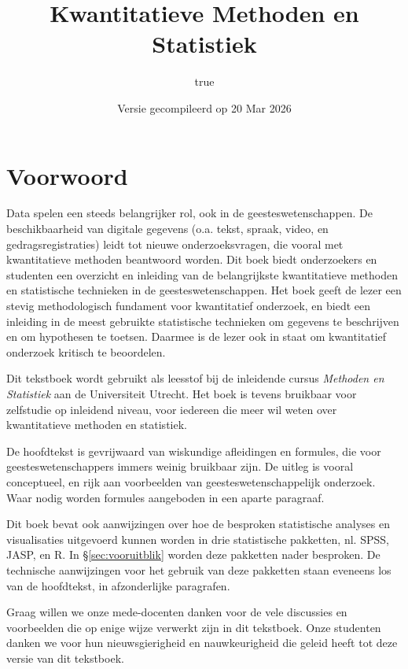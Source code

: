 \documentclass[
]{book}
\title{Kwantitatieve Methoden en Statistiek}
\author{true}
\date{Versie gecompileerd op 20 Mar 2026}
\begin{document}
\maketitle

{
\setcounter{tocdepth}{1}
\tableofcontents
}
\chapter*{Voorwoord}\label{voorwoord}

Data spelen een steeds belangrijker rol, ook in de geesteswetenschappen.
De beschikbaarheid van digitale gegevens (o.a. tekst, spraak, video, en gedragsregistraties) leidt tot nieuwe onderzoeksvragen, die vooral met kwantitatieve methoden beantwoord worden.
Dit boek biedt onderzoekers en studenten een overzicht en inleiding van de belangrijkste kwantitatieve methoden en statistische technieken in de geesteswetenschappen. Het boek geeft de lezer een stevig methodologisch fundament voor kwantitatief onderzoek, en biedt een inleiding in de meest gebruikte statistische technieken om gegevens te beschrijven en om hypothesen te toetsen. Daarmee is de lezer ook in staat om kwantitatief onderzoek kritisch te beoordelen.

Dit tekstboek wordt gebruikt als leesstof bij de inleidende cursus \emph{Methoden en Statistiek} aan de Universiteit Utrecht. Het boek is tevens bruikbaar voor zelfstudie op inleidend niveau, voor iedereen die meer wil weten over kwantitatieve methoden en statistiek.

De hoofdtekst is gevrijwaard van wiskundige afleidingen en formules, die voor geesteswetenschappers immers weinig bruikbaar zijn. De uitleg is vooral conceptueel, en rijk aan voorbeelden van geesteswetenschappelijk onderzoek. Waar nodig worden formules aangeboden in een aparte paragraaf.

Dit boek bevat ook aanwijzingen over hoe de besproken statistische analyses en visualisaties uitgevoerd kunnen worden in drie statistische pakketten, nl. SPSS, JASP, en R. In §\ref{sec:vooruitblik} worden deze pakketten nader besproken. De technische aanwijzingen voor het gebruik van deze pakketten staan eveneens los van de hoofdtekst, in afzonderlijke paragrafen.

Graag willen we onze mede-docenten danken voor de vele discussies en voorbeelden die op enige wijze verwerkt zijn in dit tekstboek. Onze studenten danken we voor hun nieuwsgierigheid en nauwkeurigheid die geleid heeft tot deze versie van dit tekstboek.
\end{document}
